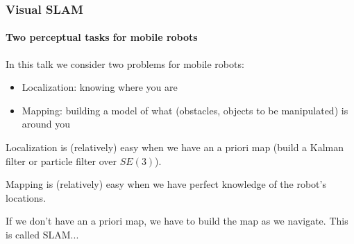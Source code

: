\documentclass[aspectratio=169]{beamer}
\newcommand{\myfig}[3]{\centerline{\texttt{[image: \#2]}}
    \centerline{\scriptsize \begin{minipage}{#1} \centering #3 \end{minipage}}}
\begin{document}
\begin{frame}
\frametitle{Visual SLAM}
\framesubtitle{Two perceptual tasks for mobile robots}

In this talk we consider two problems for mobile robots:
\begin{itemize}
\item \alert{Localization}: knowing \alert{where} you are
\item \alert{Mapping}: building a model of \alert{what} (obstacles,
        objects to be manipulated) is around you
\end{itemize}

\medskip

Localization is (relatively) easy when we have an \alert{a priori map}
(build a Kalman filter or particle filter over $SE(3)$).

\medskip

Mapping is (relatively) easy when we have \alert{perfect knowledge of the
robot's locations}.

\medskip

If we don't have an a priori map, we have to build the map as we
navigate.  This is called \alert{SLAM}...


\end{frame}


\end{document}
